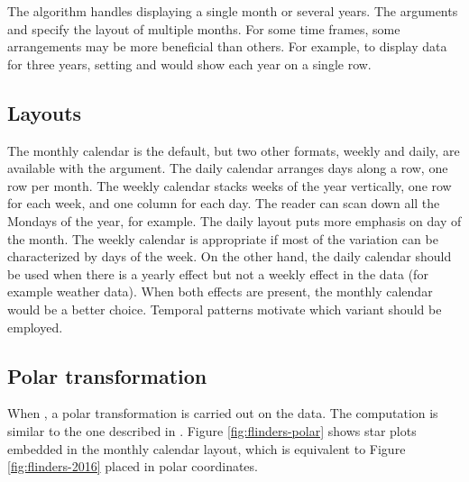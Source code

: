 \documentclass[article]{jss}
\theoremstyle{definition}
\theoremstyle{definition}
\theoremstyle{definition}
\theoremstyle{remark}
\begin{document}
The algorithm handles displaying a single month or several years. The
arguments  and  specify the layout of multiple
months. For some time frames, some arrangements may be more beneficial
than others. For example, to display data for three years, setting
 and  would show each year on a single
row.

\subsection{Layouts}\label{layouts}

The monthly calendar is the default, but two other formats, weekly and
daily, are available with the  argument. The daily
calendar arranges days along a row, one row per month. The weekly
calendar stacks weeks of the year vertically, one row for each week, and
one column for each day. The reader can scan down all the Mondays of the
year, for example. The daily layout puts more emphasis on day of the
month. The weekly calendar is appropriate if most of the variation can
be characterized by days of the week. On the other hand, the daily
calendar should be used when there is a yearly effect but not a weekly
effect in the data (for example weather data). When both effects are
present, the monthly calendar would be a better choice. Temporal
patterns motivate which variant should be employed.

\subsection{Polar transformation}\label{polar-transformation}

When , a polar transformation is carried out on the
data. The computation is similar to the one described in
\citet{Wickham2012glyph}. Figure \ref{fig:flinders-polar} shows star
plots embedded in the monthly calendar layout, which is equivalent to
Figure \ref{fig:flinders-2016} placed in polar coordinates.
\end{document}
